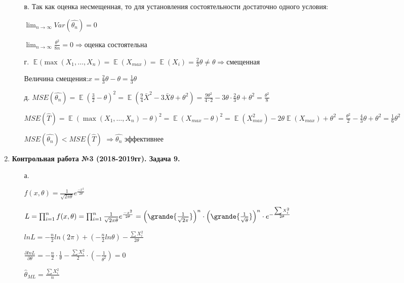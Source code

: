 \documentclass[112pt, cmcyralt]{article}
\DeclareMathOperator{\E}{\mathbb{E}}
\begin{document}
\begin{enumerate}
\begin{enumerate}
\item[в.]
Так как оценка несмещенная, то для установления состоятельности достаточно одного условия:

$\lim_{n\to\infty}Var(\hat{\theta_n})=0$

$\lim_{n\to\infty}\frac{\theta^2}{8n}=0 \Rightarrow \text{оценка состоятельна}$\\


\item[г.]
$\E(\max(X_1,\ldots,X_n)=\E(X_\textit{max})=\E(X_i)=\frac{2}{3}\theta \neq \theta \Rightarrow \text{смещенная}$

$\text{Величина смещения:} x=\frac{2}{3}\theta-\theta=\frac{1}{3}\theta$\\

\item[д.]
$MSE(\hat{\theta_n})=\E(\frac{3}{2}-\theta)^2 = \E(\frac{9}{4}\bar{X}^2 - 3\bar{X}\theta+\theta^2) = \frac{9\theta^2}{4\cdot2}-3\theta\cdot\frac{2}{3}\theta+\theta^2=\frac{\theta^2}{8}$

$MSE(\hat{T})=\E(\max(X_1,\ldots,X_n)-\theta)^2=\E(X_\textit{max}-\theta)^2=\E(X_\textit{max}^2)-2\theta \E(X_\textit{max}) +\theta^2=\frac{\theta^2}{2}-\frac{4}{3}\theta+\theta^2=\frac{1}{6}\theta^2$

$MSE(\hat{\theta_n})<MSE(\hat{T})$ $\Rightarrow \hat{\theta_n}$ эффективнее

\end{enumerate}

\item
\textbf{Контрольная работа №3 (2018-2019гг). Задача 9.}

\begin{enumerate}

\item[а.]

$f(x,\theta) = \frac{1}{\sqrt{2\pi\theta}}e^{\frac{-x^2}{2\theta}}$

$L=\prod_{i=1}^{n} f(x,\theta) = \prod_{i=1}^{n} \frac{1}{\sqrt{2\pi\theta}}e^{\frac{-x^2}{2\theta}} = \qty(\grande{\frac{1}{\sqrt{2\pi}}})^n \cdot \qty(\grande{\frac{1}{\sqrt{\theta}}})^n \cdot e^{-\frac{\sum X_i^2}{2\theta}}$

$ln L = -\frac{n}{2}ln(2\pi)+(-\frac{n}{2}ln\theta)-\frac{\sum X_i^2}{2\theta}$

$\frac{\partial lnL}{\partial\theta}=-\frac{n}{2}\cdot\frac{1}{\theta}-\frac{\sum X_i^2}{2}\cdot (-\frac{1}{\theta^2})=0$

$\hat\theta_\textit{ML} = \frac{\sum X_i^2}{n}$


\end{enumerate}
\end{enumerate}
\end{document}
